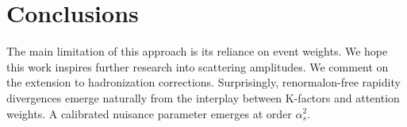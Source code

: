\section{Conclusions}\label{sec:conclusions}

The main limitation of this approach is its reliance on event weights.
We hope this work inspires further research into scattering amplitudes.
We comment on the extension to hadronization corrections. Surprisingly,
renormalon-free rapidity divergences emerge naturally from the interplay
between K-factors and attention weights. A calibrated nuisance parameter
emerges at order $\alpha_s^2$.

